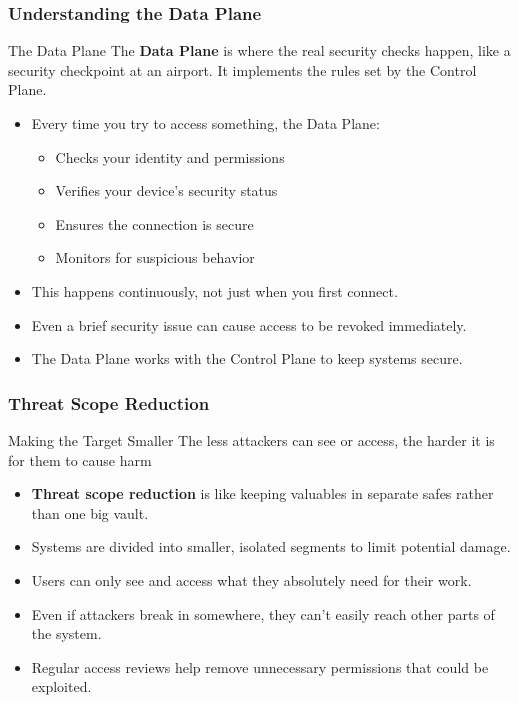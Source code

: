 \documentclass{beamer}
\begin{document}
\begin{frame}
    \frametitle{Understanding the Data Plane}

    \begin{block}{The Data Plane}
        The \textbf{Data Plane} is where the real security checks happen, like a security checkpoint at an airport. It implements the rules set by the Control Plane.
    \end{block}

    \begin{itemize}
        \item Every time you try to access something, the Data Plane:
            \begin{itemize}
                \item Checks your identity and permissions
                \item Verifies your device's security status
                \item Ensures the connection is secure
                \item Monitors for suspicious behavior
            \end{itemize}
        \item This happens continuously, not just when you first connect.
        \item Even a brief security issue can cause access to be revoked immediately.
        \item The Data Plane works with the Control Plane to keep systems secure.
    \end{itemize}
\end{frame}

\begin{frame}
    \frametitle{Threat Scope Reduction}
    \begin{block}{Making the Target Smaller}
        The less attackers can see or access, the harder it is for them to cause harm
    \end{block}
    \begin{itemize}
        \item \textbf{Threat scope reduction} is like keeping valuables in separate safes rather than one big vault.
        \item Systems are divided into smaller, isolated segments to limit potential damage.
        \item Users can only see and access what they absolutely need for their work.
        \item Even if attackers break in somewhere, they can't easily reach other parts of the system.
        \item Regular access reviews help remove unnecessary permissions that could be exploited.
    \end{itemize}
\end{frame}
\end{document}
